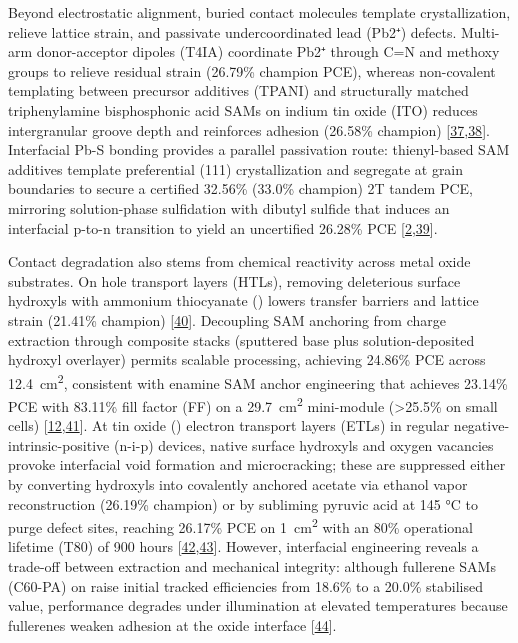 \documentclass[
  11pt,
]{article}
\begin{document}
Beyond electrostatic alignment, buried contact molecules template
crystallization, relieve lattice strain, and passivate undercoordinated
lead (Pb2⁺) defects. Multi-arm donor-acceptor dipoles (T4IA) coordinate
Pb2⁺ through C=N and methoxy groups to relieve residual strain (26.79\%
champion PCE), whereas non-covalent templating between precursor
additives (TPANI) and structurally matched triphenylamine bisphosphonic
acid SAMs on indium tin oxide (ITO) reduces intergranular groove depth
and reinforces adhesion (26.58\% champion)
{[}\href{https://doi.org/10.1002/anie.3716107}{37},\href{https://doi.org/10.1002/anie.6932848}{38}{]}.
Interfacial Pb-S bonding provides a parallel passivation route:
thienyl-based SAM additives template preferential (111) crystallization
and segregate at grain boundaries to secure a certified 32.56\% (33.0\%
champion) 2T tandem PCE, mirroring solution-phase sulfidation with
dibutyl sulfide that induces an interfacial p-to-n transition to yield
an uncertified 26.28\% PCE
{[}\href{https://doi.org/10.1002/anie.5241611}{2},\href{https://doi.org/10.1021/acsami.6c07884}{39}{]}.

Contact degradation also stems from chemical reactivity across metal
oxide substrates. On  hole transport layers (HTLs), removing
deleterious surface hydroxyls with ammonium thiocyanate ()
lowers transfer barriers and lattice strain (21.41\% champion)
{[}\href{https://doi.org/10.1021/acsaem.6c01708}{40}{]}. Decoupling SAM
anchoring from charge extraction through composite  stacks
(sputtered base plus solution-deposited hydroxyl overlayer) permits
scalable processing, achieving 24.86\% PCE across
\qty{12.4}{\centi\meter\squared}, consistent with enamine SAM anchor
engineering that achieves 23.14\% PCE with 83.11\% fill factor (FF) on a
\qty{29.7}{\centi\meter\squared} mini-module (\textgreater25.5\% on
small cells)
{[}\href{https://doi.org/10.1002/advs.76950}{12},\href{https://doi.org/10.1002/smll.75056}{41}{]}.
At tin oxide () electron transport layers (ETLs) in regular
negative-intrinsic-positive (n-i-p) devices, native surface hydroxyls
and oxygen vacancies provoke interfacial void formation and
microcracking; these are suppressed either by converting hydroxyls into
covalently anchored acetate via ethanol vapor reconstruction (26.19\%
champion) or by subliming pyruvic acid at 145 °C to purge defect sites,
reaching 26.17\% PCE on \qty{1}{\centi\meter\squared} with an 80\%
operational lifetime (T80) of 900 hours
{[}\href{https://doi.org/10.1002/smll.75122}{42},\href{https://doi.org/10.1002/aenm.71514}{43}{]}.
However, interfacial engineering reveals a trade-off between extraction
and mechanical integrity: although fullerene SAMs (C60-PA) on 
raise initial tracked efficiencies from 18.6\% to a 20.0\% stabilised
value, performance degrades under illumination at elevated temperatures
because fullerenes weaken adhesion at the oxide interface
{[}\href{https://doi.org/10.1021/acsenergylett.6c01485}{44}{]}.
\end{document}
